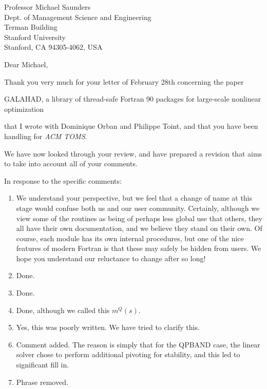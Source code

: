 \documentclass[12pt,a4paper]{letter}
\newcommand{\gal}{{\sf GALAHAD}}
\begin{document}
\begin{letter}{Professor Michael Saunders \\
Dept. of Management Science and Engineering \\
Terman Building \\
Stanford University \\
Stanford, CA 94305-4062, USA}

\noindent
\opening{Dear Michael,}

Thank you very much for your letter of  February 28th concerning the paper
\begin{center}
 \gal, a library of thread-safe Fortran 90
packages for large-scale nonlinear optimization
\end{center}
that I wrote with Dominique Orban and Philippe Toint, and that
you have been handling for {\em ACM TOMS}.

We have now looked through your review, and have prepared a
revision that aims to take into account all of your comments.

In response to the specific comments:

\begin{enumerate}
\item We understand your perspective, but we feel that a change of
name at this stage would confuse both us and our user community.
Certainly, although we view some of the routines as being of perhaps
less global use that others, they all have their own documentation,
and we believe they stand on their own. Of course, each module has
its own internal procedures, but one of the nice features of
modern Fortran is that these may safely be hidden from users. We hope
you understand our reluctance to change after so long!

\item Done.

\item Done.

\item Done, although we called this $m^Q(s)$.

\item Yes, this was poorly written. We have tried to clarify this.

\item Comment added. The reason is simply that for the QPBAND case,
the linear solver chose to perform additional pivoting for stability,
and this led to significant fill in.

\item Phrase removed.


\end{enumerate}
\end{letter}
\end{document}
